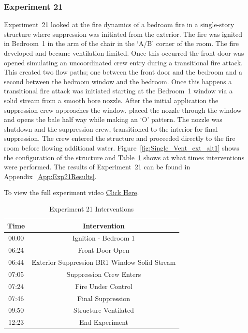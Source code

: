 \documentclass[12pt,oneside]{book}
\begin{document}
\subsubsection{Experiment 21}
Experiment~21 looked at the fire dynamics of a bedroom fire in a single-story structure where suppression was initiated from the exterior. The fire was ignited in Bedroom~1 in the arm of the chair in the `A/B' corner of the room. The fire developed and became ventilation limited. Once this occurred the front door was opened simulating an uncoordinated crew entry during a transitional fire attack. This created two flow paths; one between the front door and the bedroom and a second between the bedroom window and the bedroom. Once this happens a transitional fire attack was initiated starting at the Bedroom~1 window via a solid stream from a smooth bore nozzle. After the initial application the suppression crew approaches the window, placed the nozzle through the window and opens the bale half way while making an `O' pattern. The nozzle was shutdown and the suppression crew, transitioned to the interior for final suppression. The crew entered the structure and proceeded directly to the fire room before flowing additional water. Figure~\ref{fig:Single_Vent_ext_alt1} shows the configuration of the structure and Table~\ref{Table:Exp21Interventions} shows at what times interventions were performed. The results of Experiment~21 can be found in Appendix~\ref{App:Exp21Results}. 

To view the full experiment video \href{https://player.vimeo.com/video/170499627?autoplay=1}{Click Here}.

\begin{table}[H]
	\centering
	\caption{Experiment 21 Interventions}
	\begin{tabular}{|c|c|} 
		\hline
		Time & Intervention \\ \hline \hline
		00:00 & Ignition - Bedroom 1 \\ \hline
		06:24 & Front Door Open \\ \hline
		06:44 & Exterior Suppression BR1 Window Solid Stream \\ \hline
		07:05 & Suppression Crew Enters\\ \hline
		07:24 & Fire Under Control 	\\ \hline
		07:46 & Final Suppression \\ \hline 
		09:50 & Structure Ventilated \\ \hline
		12:23 & End Experiment\\ \hline
	\end{tabular}
	\label{Table:Exp21Interventions}
\end{table}
\end{document}
